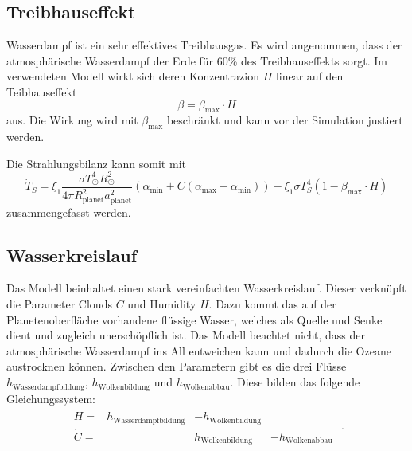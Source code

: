 \begin{refsection}
\subsection{Treibhauseffekt}
Wasserdampf ist ein sehr effektives Treibhausgas. Es wird angenommen, dass der atmosphärische Wasserdampf der Erde für 60\% des Treibhauseffekts sorgt.  
Im verwendeten Modell wirkt sich deren Konzentrazion $H$ linear auf den Teibhauseffekt 
\begin{equation}
\beta  = \beta_{\text{max}} \cdot H
\end{equation}
aus. Die Wirkung wird mit $\beta_{\text{max}}$ beschränkt und kann vor der Simulation justiert werden.

Die Strahlungsbilanz kann somit mit
\begin{equation}
\dot{T}_S = \xi_1 \frac{\sigma T_{\astrosun}^4 R_{\astrosun}^2}{4 \pi R_{\text{planet}}^2 a_{\text{planet}}^2} (\alpha_{\text{min}} + C(\alpha_{\text{max}} - \alpha_{\text{min}})) - \xi_1 \sigma T_{S}^4  (1 - \beta_{\text{max}} \cdot H)
\end{equation}
zusammengefasst werden.

\subsection{Wasserkreislauf}
Das Modell beinhaltet einen stark vereinfachten Wasserkreislauf.
Dieser verknüpft die Parameter Clouds $C$ und Humidity $H$.
Dazu kommt das auf der Planetenoberfläche vorhandene flüssige Wasser, welches als Quelle und Senke dient und zugleich unerschöpflich ist. Das Modell beachtet nicht, dass der atmosphärische Wasserdampf ins All entweichen kann und dadurch die Ozeane austrocknen können. Zwischen den Parametern gibt es die drei Flüsse $h_{\text{Wasserdampfbildung}}$, $h_{\text{Wolkenbildung}}$ und $h_{\text{Wolkenabbau}}$. Diese bilden das folgende Gleichungssystem: 
\begin{equation}
\begin{matrix}
\dot{H}   = & h_{\text{Wasserdampfbildung}} & - h_{\text{Wolkenbildung}}   &                      \\
\dot{C}   = &                     		    &   h_{\text{Wolkenbildung}}   & - h_{\text{Wolkenabbau}}
\end{matrix} \text{ .}
\end{equation}


\end{refsection}
